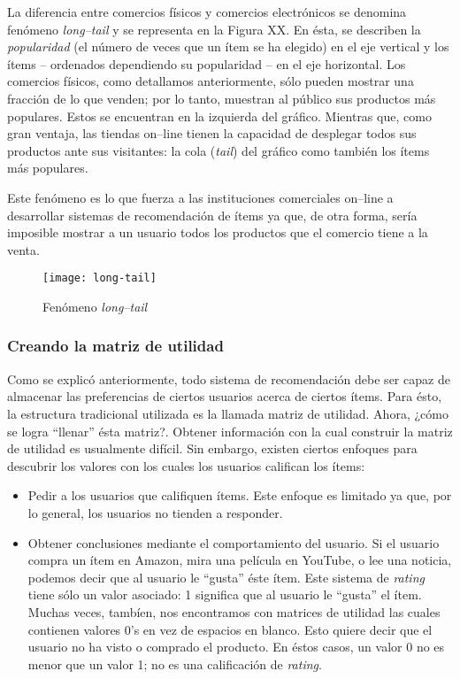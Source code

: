 			La diferencia entre comercios físicos y comercios electrónicos se denomina fenómeno \textit{long--tail} y se representa en la Figura XX. En ésta, se describen la \textit{popularidad} (el número de veces que un ítem se ha elegido) en el eje vertical y los ítems -- ordenados dependiendo su popularidad -- en el eje horizontal. Los comercios físicos, como detallamos anteriormente, sólo pueden mostrar una fracción de lo que venden; por lo tanto, muestran al público sus productos más populares. Estos se encuentran en la izquierda del gráfico. Mientras que, como gran ventaja, las tiendas on--line tienen la capacidad de desplegar todos sus productos ante sus visitantes: la cola (\textit{tail}) del gráfico como también los ítems más populares. \par
			
			Este fenómeno es lo que fuerza a las instituciones comerciales on--line a desarrollar sistemas de recomendación de ítems ya que, de otra forma, sería imposible mostrar a un usuario todos los productos que el comercio tiene a la venta.
			
			\begin{figure}[h]
				\texttt{[image: long-tail]}
				\centering
				\caption{Fenómeno \textit{long--tail}}
			\end{figure}
			
		\subsubsection{Creando la matriz de utilidad}
			Como se explicó anteriormente, todo sistema de recomendación debe ser capaz de almacenar las preferencias de ciertos usuarios acerca de ciertos ítems. Para ésto, la estructura tradicional utilizada es la llamada matriz de utilidad. Ahora, ¿cómo se logra \enquote{llenar} ésta matriz?. Obtener información con la cual construir la matriz de utilidad es usualmente difícil. Sin embargo, existen ciertos enfoques para descubrir los valores con los cuales los usuarios califican los ítems:
			\begin{itemize}
				\item Pedir a los usuarios que califiquen ítems. Este enfoque es limitado ya que, por lo general, los usuarios no tienden a responder.
				\item Obtener conclusiones mediante el comportamiento del usuario. Si el usuario compra un ítem en Amazon, mira una película en YouTube, o lee una noticia, podemos decir que al usuario le \enquote{gusta} éste ítem. Este sistema de \textit{rating} tiene sólo un valor asociado: 1 significa que al usuario le \enquote{gusta} el ítem. Muchas veces, tambíen, nos encontramos con matrices de utilidad las cuales contienen valores 0's en vez de espacios en blanco. Esto quiere decir que el usuario no ha visto o comprado el producto. En éstos casos, un valor 0 no es menor que un valor 1; no es una calificación de \textit{rating}.
			\end{itemize}
			
